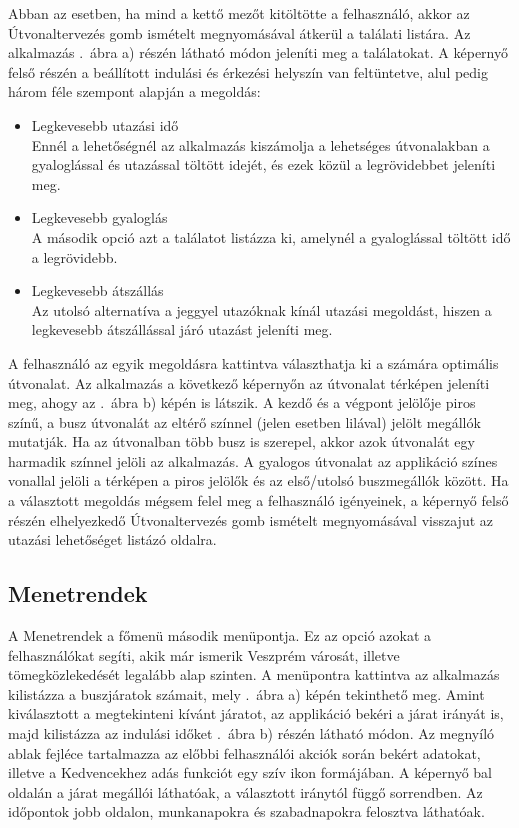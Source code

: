 Abban az esetben, ha mind a kettő mezőt kitöltötte a felhasználó, akkor az Útvonaltervezés gomb ismételt megnyomásával átkerül a találati listára.
Az alkalmazás .\ ábra a) részén látható módon jeleníti meg a találatokat.
A képernyő felső részén a beállított indulási és érkezési helyszín van feltüntetve, alul pedig három féle szempont alapján a megoldás:
\begin{itemize}
	\item Legkevesebb utazási idő
	\\Ennél a lehetőségnél az alkalmazás kiszámolja a lehetséges útvonalakban a gyaloglással és utazással töltött idejét, és ezek közül a legrövidebbet jeleníti meg.
	\item Legkevesebb gyaloglás
	\\A második opció azt a találatot listázza ki, amelynél a gyaloglással töltött idő a legrövidebb.
	\item Legkevesebb átszállás
	\\Az utolsó alternatíva a jeggyel utazóknak kínál utazási megoldást, hiszen a legkevesebb átszállással járó utazást jeleníti meg.
\end{itemize}
A felhasználó az egyik megoldásra kattintva választhatja ki a számára optimális útvonalat.
Az alkalmazás a következő képernyőn az útvonalat térképen jeleníti meg, ahogy az .\ ábra b) képén is látszik.
A kezdő és a végpont jelölője piros színű, a busz útvonalát az eltérő színnel (jelen esetben lilával) jelölt megállók mutatják.
Ha az útvonalban több busz is szerepel, akkor azok útvonalát egy harmadik színnel jelöli az alkalmazás.
A gyalogos útvonalat az applikáció színes vonallal jelöli a térképen a piros jelölők és az első/utolsó buszmegállók között.
Ha a választott megoldás mégsem felel meg a felhasználó igényeinek, a képernyő felső részén elhelyezkedő Útvonaltervezés gomb ismételt megnyomásával visszajut az utazási lehetőséget listázó oldalra.
\subsection {Menetrendek}
\label {menetrendek}
A Menetrendek a főmenü második menüpontja.
Ez az opció azokat a felhasználókat segíti, akik már ismerik Veszprém városát, illetve tömegközlekedését legalább alap szinten.
A menüpontra kattintva az alkalmazás kilistázza a buszjáratok számait, mely .\ ábra  a) képén tekinthető meg.
Amint kiválasztott a megtekinteni kívánt járatot, az applikáció bekéri a járat irányát is, majd kilistázza az indulási időket .\ ábra b) részén látható módon.
Az megnyíló ablak fejléce tartalmazza az előbbi felhasználói akciók során bekért adatokat, illetve a Kedvencekhez adás funkciót egy szív ikon formájában.
A képernyő bal oldalán a járat megállói láthatóak, a választott iránytól függő sorrendben.
Az időpontok jobb oldalon, munkanapokra és szabadnapokra felosztva láthatóak.

